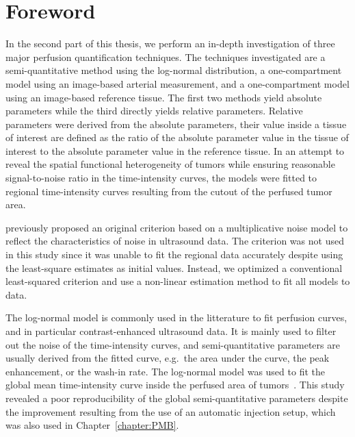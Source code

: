 \chapter*{Foreword}
In the second part of this thesis, we perform an in-depth investigation of three major perfusion quantification techniques.
The techniques investigated are a semi-quantitative method using the log-normal distribution, a one-compartment model using an image-based arterial measurement, and a one-compartment model using an image-based reference tissue. 
The first two methods yield absolute parameters while the third directly yields relative parameters.
Relative parameters were derived from the absolute parameters, their value inside a tissue of interest are defined as the ratio of the absolute parameter value in the tissue of interest to the absolute parameter value in the reference tissue.
In an attempt to reveal the spatial functional heterogeneity of tumors while ensuring reasonable signal-to-noise ratio in the time-intensity curves, the models were fitted to regional time-intensity curves resulting from the cutout of the perfused tumor area. 

\citet{Barrois:2013gw} previously proposed an original criterion based on a multiplicative noise model to reflect the characteristics of noise in ultrasound data.
The criterion was not used in this study since it was unable to fit the regional data accurately despite using the least-square estimates as initial values. 
Instead, we optimized a conventional least-squared criterion and use a non-linear estimation method to fit all models to data.

The log-normal model is commonly used in the litterature to fit perfusion curves, and in particular contrast-enhanced ultrasound data.
It is mainly used to filter out the noise of the time-intensity curves, and semi-quantitative parameters are usually derived from the fitted curve, e.g.~the area under the curve, the peak enhancement, or the wash-in rate. 
The log-normal model was used to fit the global mean time-intensity curve inside the perfused area of tumors~\cite{Dizeux2016cd}.
This study revealed a poor reproducibility of the global semi-quantitative parameters despite the improvement resulting from the use of an automatic injection setup, which was also used in Chapter~\ref{chapter:PMB}.

